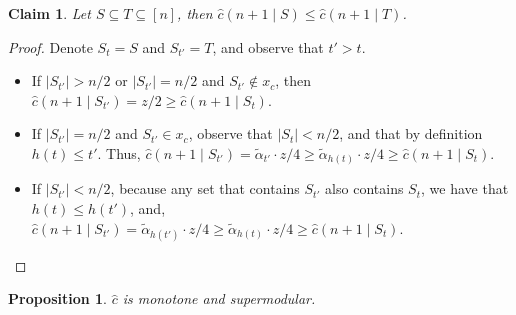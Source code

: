 \documentclass[11pt]{article}
\newtheorem{claim}{Claim}
\newtheorem{proposition}{Proposition}
\newcommand{\talpha}{\tilde{\alpha}}
\newcommand{\hc}{\hat{c}}
\begin{document}
\begin{claim}\label{cla:n+1_supermod}
    Let $S \subseteq T \subseteq [n]$, then $\hc(n+1 \mid S) \le \hc (n+1 \mid T)$.
\end{claim}
\begin{proof}
    Denote $S_t = S$ and $S_{t'} = T$, and observe that $t' >t$.
    \begin{itemize}
        \setlength\itemsep{-0.25em}
        \item If $|S_{t'}| > n/2$ or $|S_{t'}| = n/2$ and $S_{t'} \notin x_c$, then $\hc(n+1 \mid S_{t'}) = z/2 \ge \hc(n+1 \mid S_t)$.
        \item If $|S_{t'}|=n/2$ and $S_{t'} \in x_c$, 
        observe that  $|S_t| < n/2$, and that by definition $h(t) \le t'$. Thus,
        $\hc(n+1 \mid S_{t'}) = \talpha_{t'}\cdot z/4 \ge \talpha_{h(t)} \cdot z/4 \ge \hc(n+1 \mid S_t)$.
        \item If $|S_{t'}|<n/2$,
        because any set that contains $S_{t'}$ also contains $S_t$, we have that $h(t) \le h(t')$, and,
        $\hc(n+1 \mid S_{t'}) = \talpha_{h(t')}\cdot z/4 \ge \talpha_{h(t)} \cdot z/4 \ge \hc(n+1 \mid S_t)$. \qedhere
    \end{itemize}
\end{proof}

\begin{proposition}\label{prop:hc_monotone_supMod}
    $\hc$ is monotone and supermodular.
\end{proposition}
\end{document}
